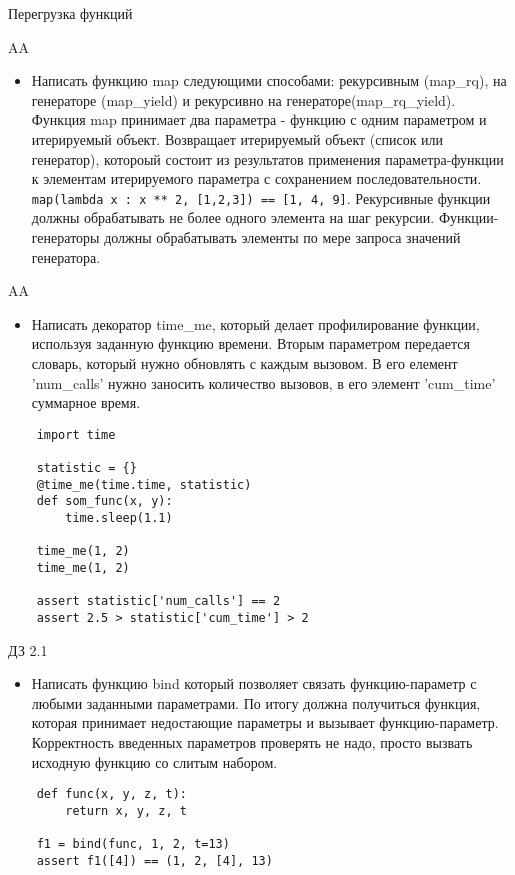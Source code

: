 \documentclass{article}
\begin{document}
{\center Перегрузка функций}
\newpage

{\center AA}
\begin{itemize}
    \item Написать функцию map следующими способами: рекурсивным (map\_rq), 
        на генераторе (map\_yield) и рекурсивно на генераторе(map\_rq\_yield).
        Функция map принимает два параметра - функцию с одним параметром и итерируемый объект. 
        Возвращает итерируемый объект (список или генератор), котороый состоит из результатов
        применения параметра-функции к элементам итерируемого параметра с сохранением последовательности.
        \lstinline!map(lambda x : x ** 2, [1,2,3]) == [1, 4, 9]!.
        Рекурсивные функции должны обрабатывать не более одного элемента на шаг рекурсии.
        Функции-генераторы должны обрабатывать элементы по мере запроса значений генератора.
\end{itemize}
\newpage

{\center AA}
\begin{itemize}
    \item Написать декоратор time\_me, который делает профилирование функции, 
        используя заданную функцию времени. Вторым параметром передается словарь,
        который нужно обновлять с каждым вызовом. В его елемент 'num\_calls' нужно
        заносить количество вызовов, в его элемент 'cum\_time' суммарное время.
\end{itemize}
\vspace{15pt}
\begin{lstlisting}
    import time

    statistic = {}
    @time_me(time.time, statistic)
    def som_func(x, y):
        time.sleep(1.1)

    time_me(1, 2)
    time_me(1, 2)

    assert statistic['num_calls'] == 2
    assert 2.5 > statistic['cum_time'] > 2
\end{lstlisting}
\newpage

{\center ДЗ 2.1}
\begin{itemize}
    \item Написать функцию bind который позволяет связать функцию-параметр с любыми заданными 
        параметрами. По итогу должна получиться функция, которая принимает недостающие параметры
        и вызывает функцию-параметр. Корректность введенных параметров проверять не надо, просто 
        вызвать исходную функцию со слитым набором.
\end{itemize}
\vspace{15pt}
\begin{lstlisting}
    def func(x, y, z, t):
        return x, y, z, t

    f1 = bind(func, 1, 2, t=13)
    assert f1([4]) == (1, 2, [4], 13)
\end{lstlisting}
\newpage
\end{document}
